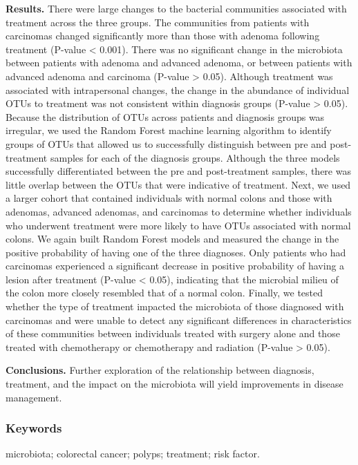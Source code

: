 \documentclass[12pt,]{article}
\begin{document}
\textbf{Results.} There were large changes to the bacterial communities
associated with treatment across the three groups. The communities from
patients with carcinomas changed significantly more than those with
adenoma following treatment (P-value \textless{} 0.001). There was no
significant change in the microbiota between patients with adenoma and
advanced adenoma, or between patients with advanced adenoma and
carcinoma (P-value \textgreater{} 0.05). Although treatment was
associated with intrapersonal changes, the change in the abundance of
individual OTUs to treatment was not consistent within diagnosis groups
(P-value \textgreater{} 0.05). Because the distribution of OTUs across
patients and diagnosis groups was irregular, we used the Random Forest
machine learning algorithm to identify groups of OTUs that allowed us to
successfully distinguish between pre and post-treatment samples for each
of the diagnosis groups. Although the three models successfully
differentiated between the pre and post-treatment samples, there was
little overlap between the OTUs that were indicative of treatment. Next,
we used a larger cohort that contained individuals with normal colons
and those with adenomas, advanced adenomas, and carcinomas to determine
whether individuals who underwent treatment were more likely to have
OTUs associated with normal colons. We again built Random Forest models
and measured the change in the positive probability of having one of the
three diagnoses. Only patients who had carcinomas experienced a
significant decrease in positive probability of having a lesion after
treatment (P-value \textless{} 0.05), indicating that the microbial
milieu of the colon more closely resembled that of a normal colon.
Finally, we tested whether the type of treatment impacted the microbiota
of those diagnosed with carcinomas and were unable to detect any
significant differences in characteristics of these communities between
individuals treated with surgery alone and those treated with
chemotherapy or chemotherapy and radiation (P-value \textgreater{}
0.05).

\textbf{Conclusions.} Further exploration of the relationship between
diagnosis, treatment, and the impact on the microbiota will yield
improvements in disease management.

\subsubsection{Keywords}\label{keywords}

microbiota; colorectal cancer; polyps; treatment; risk factor.
\end{document}
